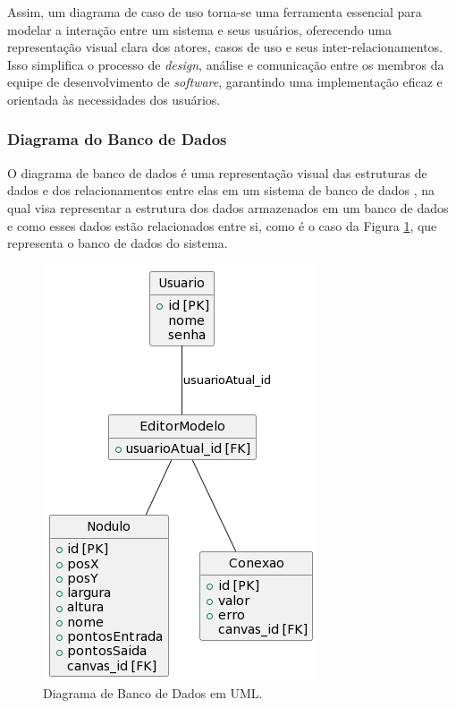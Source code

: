 Assim, um diagrama de caso de uso torna-se uma ferramenta essencial para modelar a interação entre um sistema e seus usuários, oferecendo uma representação visual clara dos atores, casos de uso e seus inter-relacionamentos. Isso simplifica o processo de \textit{design}, análise e comunicação entre os membros da equipe de desenvolvimento de \textit{software}, garantindo uma implementação eficaz e orientada às necessidades dos usuários.
        
\subsubsection{Diagrama do Banco de Dados}

O diagrama de banco de dados é uma representação visual das estruturas de dados e dos relacionamentos entre elas em um sistema de banco de dados \cite{databasedepth}, na qual visa representar a estrutura dos dados armazenados em um banco de dados e como esses dados estão relacionados entre si, como é o caso da Figura \ref{fig:DatabaseDiagram}, que representa o banco de dados do sistema.
            
\begin{figure}[htb]
    \caption{\label{fig:DatabaseDiagram}Diagrama de Banco de Dados em UML.}
    \begin{center}
        \includegraphics[height=0.25\textheight]{figuras/DatabaseDiagram.png}
    \end{center}
\end{figure}
            
